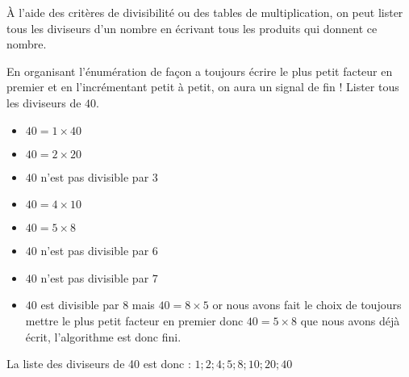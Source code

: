 \begin{methode}
	À l'aide des critères de divisibilité ou des tables de multiplication, on peut lister tous les diviseurs d'un nombre
	en écrivant tous les produits qui donnent ce nombre.

	En organisant l'énumération de façon a toujours écrire le plus petit facteur en premier et en l'incrémentant petit à petit,
	on aura un signal de fin !
	\exercice
	Lister tous les diviseurs de $40$.
	\correction
	\begin{itemize}
		\item $40 = 1 \times 40$ 
		\item $40 = 2 \times 20$
		\item $40$ n'est pas divisible par $3$
		\item $40 = 4 \times 10$
		\item $40 = 5 \times 8$
		\item $40$ n'est pas divisible par $6$
		\item $40$ n'est pas divisible par $7$
		\item $40$ est divisible par $8$ mais $40 = 8 \times 5$ or nous avons fait le choix de toujours mettre le plus petit facteur en premier donc $40 = 5 \times 8$ que nous avons déjà écrit, l'algorithme est donc fini.
	\end{itemize}

	La liste des diviseurs de 40 est donc : $1 ; 2 ; 4 ; 5 ; 8 ; 10 ; 20 ; 40$
\end{methode}